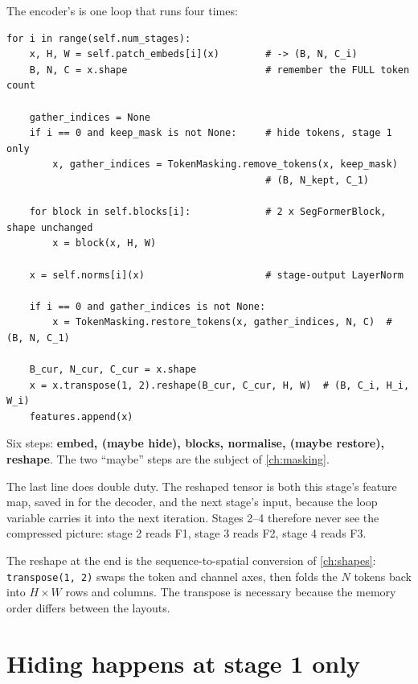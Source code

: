 The encoder's  is one loop that runs four times:
\begin{lstlisting}
for i in range(self.num_stages):
    x, H, W = self.patch_embeds[i](x)        # -> (B, N, C_i)
    B, N, C = x.shape                        # remember the FULL token count

    gather_indices = None
    if i == 0 and keep_mask is not None:     # hide tokens, stage 1 only
        x, gather_indices = TokenMasking.remove_tokens(x, keep_mask)
                                             # (B, N_kept, C_1)

    for block in self.blocks[i]:             # 2 x SegFormerBlock, shape unchanged
        x = block(x, H, W)

    x = self.norms[i](x)                     # stage-output LayerNorm

    if i == 0 and gather_indices is not None:
        x = TokenMasking.restore_tokens(x, gather_indices, N, C)  # (B, N, C_1)

    B_cur, N_cur, C_cur = x.shape
    x = x.transpose(1, 2).reshape(B_cur, C_cur, H, W)  # (B, C_i, H_i, W_i)
    features.append(x)
\end{lstlisting}
Six steps: \textbf{embed, (maybe hide), blocks, normalise, (maybe restore), reshape}. The two
``maybe'' steps are the subject of \cref{ch:masking}.

The last line does double duty. The reshaped tensor is both this stage's feature map, saved in
 for the decoder, and the next stage's input, because the loop variable  carries
it into the next iteration. Stages 2--4 therefore never see the compressed picture: stage 2 reads F1,
stage 3 reads F2, stage 4 reads F3.

The reshape at the end is the sequence-to-spatial conversion of \cref{ch:shapes}: \lstinline|transpose(1, 2)|
swaps the token and channel axes, then  folds the $N$ tokens back into $H \times W$ rows
and columns. The transpose is necessary because the memory order differs between the layouts.

\section{Hiding happens at stage 1 only}\label{sec:encoder:holes}

